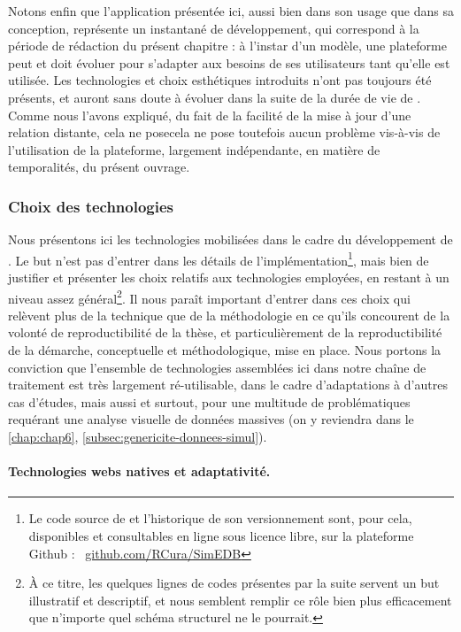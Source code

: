 Notons enfin que l'application \simedb{} présentée ici, aussi bien dans son usage que dans sa conception, représente un instantané de développement, qui correspond à la période de rédaction du présent chapitre :
à l'instar d'un modèle, une plateforme peut et doit évoluer pour s'adapter aux besoins de ses utilisateurs tant qu'elle est utilisée.
Les technologies et choix esthétiques introduits n'ont pas toujours été présents, et auront sans doute à évoluer dans la suite de la \og durée de vie\fg{} de \simedb{}.
Comme nous l'avons expliqué, du fait de la facilité de la mise à jour d'une relation distante, cela ne posecela ne pose toutefois aucun problème vis-à-vis de l'utilisation de la plateforme, largement indépendante, en matière de temporalités, du présent ouvrage.

\subsubsection{Choix des technologies}

Nous présentons ici les technologies mobilisées dans le cadre du développement de \simedb{}.
Le but n'est pas d'entrer dans les détails de l'implémentation\footnote{
	Le code source de \simedb{} et l'historique de son versionnement sont, pour cela, disponibles et consultables en ligne sous licence libre, sur la plateforme Github : 
	\faGithub~\href{https://github.com/RCura/SimEDB}{github.com/RCura/SimEDB}
}, mais bien de justifier et présenter les choix relatifs aux technologies employées, en restant à un niveau assez général\footnote{
	À ce titre, les quelques lignes de codes présentes par la suite servent un but illustratif et descriptif, et nous semblent remplir ce rôle bien plus efficacement que n'importe quel schéma structurel ne le pourrait.
}.
Il nous paraît important d'entrer dans ces choix qui relèvent plus de la technique que de la méthodologie en ce qu'ils concourent de la volonté de reproductibilité de la thèse, et particulièrement de la reproductibilité de la démarche, conceptuelle et méthodologique, mise en place.
Nous portons la conviction que l'ensemble de technologies assemblées ici dans notre \og chaîne de traitement\fg{} est très largement ré-utilisable, dans le cadre d'adaptations à d'autres cas d'études, mais aussi et surtout, pour une multitude de problématiques requérant une analyse visuelle de données massives (on y reviendra dans le \cref{chap:chap6}, \cref{subsec:genericite-donnees-simul}).

\paragraph{Technologies webs \og natives\fg{} et adaptativité.}

